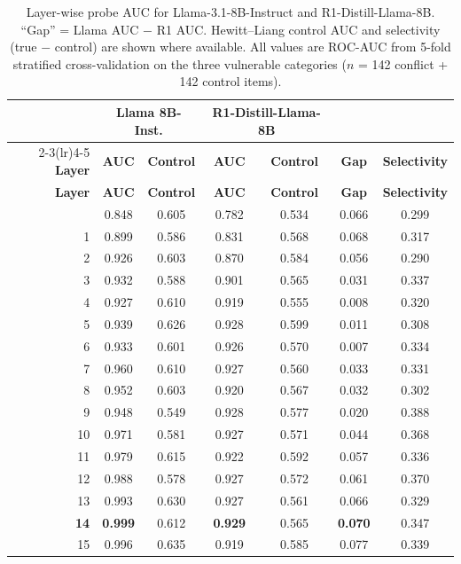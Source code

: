 \documentclass{article}
\begin{document}
\begin{longtable}{rcccccc}
\caption{Layer-wise probe AUC for Llama-3.1-8B-Instruct and
  R1-Distill-Llama-8B.  ``Gap'' = Llama AUC $-$ R1 AUC.
  Hewitt--Liang control AUC and selectivity (true $-$ control) are
  shown where available.  All values are ROC-AUC from 5-fold
  stratified cross-validation on the three vulnerable categories
  ($n$ = 142 conflict + 142 control items).}
\label{tab:probe_all_layers} \\
\toprule
& \multicolumn{2}{c}{\textbf{Llama 8B-Inst.}} & \multicolumn{2}{c}{\textbf{R1-Distill-Llama-8B}} & & \\
\cmidrule(lr){2-3}\cmidrule(lr){4-5}
\textbf{Layer} & \textbf{AUC} & \textbf{Control} & \textbf{AUC} & \textbf{Control} & \textbf{Gap} & \textbf{Selectivity} \\
\midrule
\endfirsthead
\toprule
\textbf{Layer} & \textbf{AUC} & \textbf{Control} & \textbf{AUC} & \textbf{Control} & \textbf{Gap} & \textbf{Selectivity} \\
\midrule
\endhead
\bottomrule
\endfoot
 0 & 0.848 & 0.605 & 0.782 & 0.534 & 0.066 & 0.299 \\
 1 & 0.899 & 0.586 & 0.831 & 0.568 & 0.068 & 0.317 \\
 2 & 0.926 & 0.603 & 0.870 & 0.584 & 0.056 & 0.290 \\
 3 & 0.932 & 0.588 & 0.901 & 0.565 & 0.031 & 0.337 \\
 4 & 0.927 & 0.610 & 0.919 & 0.555 & 0.008 & 0.320 \\
 5 & 0.939 & 0.626 & 0.928 & 0.599 & 0.011 & 0.308 \\
 6 & 0.933 & 0.601 & 0.926 & 0.570 & 0.007 & 0.334 \\
 7 & 0.960 & 0.610 & 0.927 & 0.560 & 0.033 & 0.331 \\
 8 & 0.952 & 0.603 & 0.920 & 0.567 & 0.032 & 0.302 \\
 9 & 0.948 & 0.549 & 0.928 & 0.577 & 0.020 & 0.388 \\
10 & 0.971 & 0.581 & 0.927 & 0.571 & 0.044 & 0.368 \\
11 & 0.979 & 0.615 & 0.922 & 0.592 & 0.057 & 0.336 \\
12 & 0.988 & 0.578 & 0.927 & 0.572 & 0.061 & 0.370 \\
13 & 0.993 & 0.630 & 0.927 & 0.561 & 0.066 & 0.329 \\
\textbf{14} & \textbf{0.999} & 0.612 & \textbf{0.929} & 0.565 & \textbf{0.070} & 0.347 \\
15 & 0.996 & 0.635 & 0.919 & 0.585 & 0.077 & 0.339 \\

\end{longtable}
\end{document}
